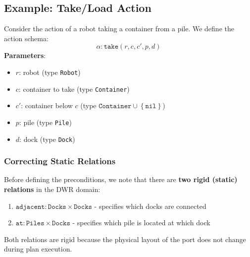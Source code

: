 \documentclass[a4paper]{article}
\theoremstyle{definition}
\begin{document}
\subsection{Example: Take/Load Action}
Consider the action of a robot taking a container from a pile. We define the action schema:
\[
  \alpha : \texttt{take}(r,c,c',p,d)
\]
\textbf{Parameters}:
\begin{itemize}
    \item \( r \): robot (type \texttt{Robot})
    \item \( c \): container to take (type \texttt{Container})
    \item \( c' \): container below \( c \) (type \( \texttt{Container} \cup \left\{ \texttt{nil} \right\} \))
    \item \( p \): pile (type \texttt{Pile})
    \item \( d \): dock (type \texttt{Dock})
\end{itemize}
\subsubsection{Correcting Static Relations}
Before defining the preconditions, we note that there are \textbf{two rigid (static) relations} in the DWR domain:
\begin{enumerate}
    \item \( \texttt{adjacent}: \texttt{Docks} \times \texttt{Docks} \) - specifies which docks are connected 
    \item \( \texttt{at}: \texttt{Piles} \times \texttt{Docks} \) - specifies which pile is located at which dock
\end{enumerate}
Both relations are rigid because the physical layout of the port does not change during plan execution.
\end{document}
